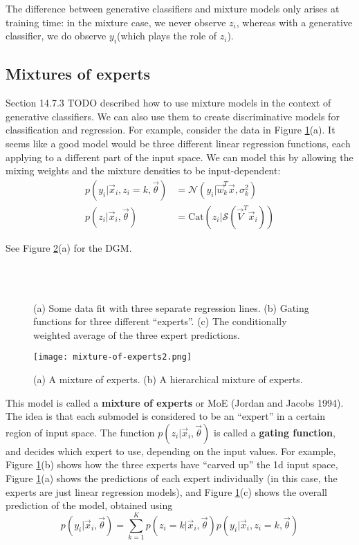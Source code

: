 The difference between generative classifiers and mixture models only arises at training time: in the mixture case, we never observe $z_i$, whereas with a generative classifier, we do observe $y_i$(which plays the role of $z_i$).


\subsection{Mixtures of experts}
Section 14.7.3 TODO described how to use mixture models in the context of generative classifiers. We can also use them to create discriminative models for classification and regression. For example, consider the data in Figure \ref{fig:mixture-of-experts}(a). It seems like a good model would be three different linear regression functions, each applying to a different part of the input space. We can model this by allowing the mixing weights and the mixture densities to be input-dependent:
\begin{align}
p(y_i|\vec{x}_i,z_i=k,\vec{\theta}) & =\mathcal{N}(y_i|\vec{w}_k^T\vec{x},\sigma_k^2) \\
p(z_i | \vec{x}_i,\vec{\theta}) & = \mathrm{Cat}(z_i|\mathcal{S}(\vec{V}^T\vec{x}_i))
\end{align}

See Figure \ref{fig:mixture-of-experts2}(a) for the DGM.

\begin{figure}[hbtp]
\centering
{} \\
 \\
\caption{(a) Some data fit with three separate regression lines. (b) Gating functions for three different “experts”. (c) The conditionally weighted average of the three expert predictions.}
\label{fig:mixture-of-experts} 
\end{figure}

\begin{figure}[hbtp]
\centering
    \texttt{[image: mixture-of-experts2.png]}
\caption{(a) A mixture of experts. (b) A hierarchical mixture of experts.}
\label{fig:mixture-of-experts2} 
\end{figure}

This model is called a \textbf{mixture of experts} or MoE (Jordan and Jacobs 1994). The idea is that each submodel is considered to be an “expert” in a certain region of input space. The function $p(z_i | \vec{x}_i,\vec{\theta})$ is called a \textbf{gating function}, and decides which expert to use, depending on the input values. For example, Figure \ref{fig:mixture-of-experts}(b) shows how the three experts have “carved up” the 1d input space, Figure \ref{fig:mixture-of-experts}(a) shows the predictions of each expert individually (in this case, the experts are just linear regression models), and Figure \ref{fig:mixture-of-experts}(c) shows the overall prediction of the model, obtained using
\begin{equation}
p(y_i|\vec{x}_i,\vec{\theta})=\sum\limits_{k=1}^K p(z_i=k | \vec{x}_i,\vec{\theta})p(y_i|\vec{x}_i,z_i=k,\vec{\theta})
\end{equation}

